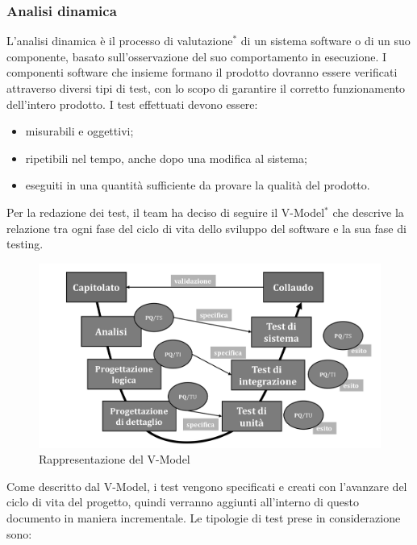 \subsubsection{Analisi dinamica}
L'analisi dinamica è il processo di valutazione$^*$ di un sistema software o di un suo componente, basato sull'osservazione del suo comportamento in esecuzione.
I componenti software che insieme formano il prodotto dovranno essere verificati attraverso diversi tipi di test, con lo scopo di garantire il corretto funzionamento dell'intero prodotto.
I test effettuati devono essere:
\begin{itemize}
\item misurabili e oggettivi;
\item ripetibili nel tempo, anche dopo una modifica al sistema;
\item eseguiti in una quantità sufficiente da provare la qualità del prodotto.
\end{itemize} 
Per la redazione dei test, il team ha deciso di seguire il V-Model$^*$ che descrive la relazione tra ogni fase del ciclo di vita dello sviluppo del software e la sua fase di testing.
\begin{figure}[htbp]
		\centering
		\includegraphics[scale=0.5]{images/vmodel.png}
		\caption{Rappresentazione del V-Model}
	
\end{figure}
\newline
Come descritto dal V-Model, i test vengono specificati e creati con l'avanzare del ciclo di vita del progetto, quindi verranno aggiunti all'interno di questo documento in maniera incrementale.
Le tipologie di test prese in considerazione sono:

